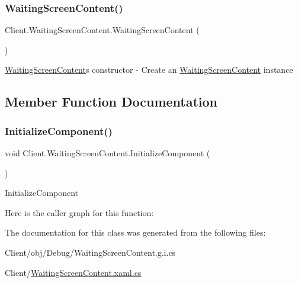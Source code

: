 \subsubsection{\texorpdfstring{Waiting\+Screen\+Content()}{WaitingScreenContent()}}
{\footnotesize\ttfamily Client.\+Waiting\+Screen\+Content.\+Waiting\+Screen\+Content (\begin{DoxyParamCaption}{ }\end{DoxyParamCaption})\hspace{0.3cm}{\ttfamily [inline]}}

\hyperlink{class_client_1_1_waiting_screen_content}{Waiting\+Screen\+Content}\textquotesingle{}s constructor -\/ Create an \hyperlink{class_client_1_1_waiting_screen_content}{Waiting\+Screen\+Content} instance 

\subsection{Member Function Documentation}
\mbox{\label{class_client_1_1_waiting_screen_content_ae0f844e30146525367bff1716bbeabe6}} 
\subsubsection{\texorpdfstring{Initialize\+Component()}{InitializeComponent()}}
{\footnotesize\ttfamily void Client.\+Waiting\+Screen\+Content.\+Initialize\+Component (\begin{DoxyParamCaption}{ }\end{DoxyParamCaption})\hspace{0.3cm}{\ttfamily [inline]}}



Initialize\+Component 

Here is the caller graph for this function\+:


The documentation for this class was generated from the following files\+:\begin{DoxyCompactItemize}
\item 
Client/obj/\+Debug/Waiting\+Screen\+Content.\+g.\+i.\+cs\item 
Client/\hyperlink{_waiting_screen_content_8xaml_8cs}{Waiting\+Screen\+Content.\+xaml.\+cs}\end{DoxyCompactItemize}
